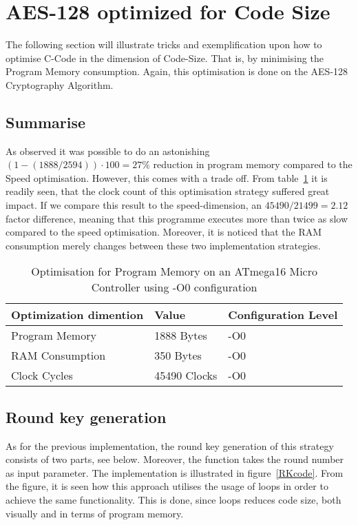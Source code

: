 \documentclass[Report.tex]{subfiles}
\begin{document}
\section{AES-128 optimized for Code Size}
The following section will illustrate tricks and exemplification 
upon how to optimise C-Code in the dimension of Code-Size.
That is, by minimising the Program Memory consumption.
Again, this optimisation is done on the AES-128 Cryptography 
Algorithm.

\subsection{Summarise}
As observed it was possible to do an astonishing $(1-(1888/2594))\cdot100 = 27\%$ reduction in
program memory compared to the Speed optimisation. However, this comes with a trade off.
From table~\ref{OPTprogram} it is readily seen, that the clock count of this optimisation strategy
suffered great impact. If we compare this result to the speed-dimension, an $45490/21499 = 2.12$
factor difference, meaning that this programme executes more than twice as slow compared to
the speed optimisation. Moreover, it is noticed that the RAM consumption merely changes between
these two implementation strategies.
 
\begin{table}[h]
\centering
    \begin{tabular}{|l|l|l|}
    \hline
    Optimization dimention 	& Value       			& Configuration Level 	\\ \hline
    Program Memory         	& 1888 Bytes   		& -O0                 		\\ \hline
    RAM Consumption        	& 350 Bytes    		& -O0                 		\\ \hline
    Clock Cycles           		& 45490 Clocks 		& -O0                 			\\ \hline
    \end{tabular}
    \caption{\label{OPTprogram} Optimisation for Program Memory on an ATmega16 Micro Controller using -O0 configuration}
\end{table}

\subsection{Round key generation}
As for the previous implementation, the round key generation of this
strategy consists of two parts, see below. Moreover,
the function takes the round number as input parameter.
The implementation is illustrated in figure~\ref{RKcode}.
From the figure, it is seen how this approach utilises the 
usage of loops in order to achieve the same functionality. This is done,
since loops reduces code size, both visually and in terms of program memory. 
\end{document}
